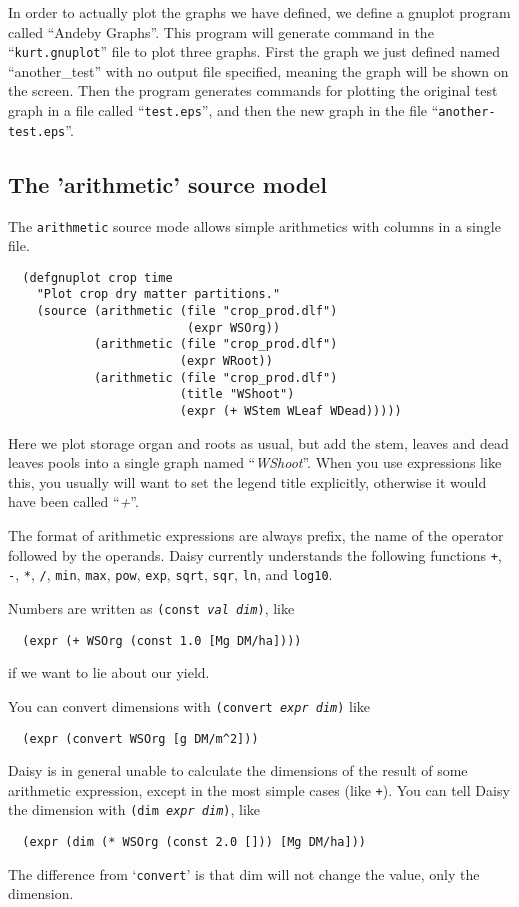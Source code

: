 \documentclass[a4paper]{article}
\begin{document}
In order to actually plot the graphs we have defined, we define a
gnuplot program called ``Andeby Graphs''.  This program will generate
command in the ``\texttt{kurt.gnuplot}'' file to plot three graphs.
First the graph we just defined named ``another\_test'' with no output
file specified, meaning the graph will be shown on the screen.  Then
the program generates commands for plotting the original test graph in
a file called ``\texttt{test.eps}'', and then the new graph in the
file ``\texttt{another-test.eps}''.

\subsection{The 'arithmetic' source model}

The \texttt{arithmetic} source mode allows simple arithmetics with
columns in a single file.
\begin{verbatim}
  (defgnuplot crop time
    "Plot crop dry matter partitions."
    (source (arithmetic (file "crop_prod.dlf")
                         (expr WSOrg))
            (arithmetic (file "crop_prod.dlf")
                        (expr WRoot))
            (arithmetic (file "crop_prod.dlf")
                        (title "WShoot")
                        (expr (+ WStem WLeaf WDead)))))
\end{verbatim}
Here we plot storage organ and roots as usual, but add the stem,
leaves and dead leaves pools into a single graph named ``\emph{WShoot}''.  When
you use expressions like this, you usually will want to set the legend
title explicitly, otherwise it would have been called ``\emph{+}''.

The format of arithmetic expressions are always prefix, the name of
the operator followed by the operands.  Daisy currently understands
the following functions \texttt{+}, \texttt{-}, \texttt{*},
\texttt{/}, \texttt{min}, \texttt{max}, \texttt{pow}, \texttt{exp},
\texttt{sqrt}, \texttt{sqr}, \texttt{ln}, and \texttt{log10}.

Numbers are written as \texttt{(const \textit{val} \textit{dim})}, like
\begin{verbatim}
  (expr (+ WSOrg (const 1.0 [Mg DM/ha])))
\end{verbatim}
if we want to lie about our yield.

You can convert dimensions with \texttt{(convert \textit{expr}
  \textit{dim})} like
\begin{verbatim}
  (expr (convert WSOrg [g DM/m^2]))
\end{verbatim}
Daisy is in general unable to calculate the dimensions of the result
of some arithmetic expression, except in the most simple cases (like
\texttt{+}).  You can tell Daisy the dimension with \texttt{(dim \textit{expr} \textit{dim})}, like
\begin{verbatim}
  (expr (dim (* WSOrg (const 2.0 [])) [Mg DM/ha]))
\end{verbatim}
The difference from `\texttt{convert}' is that dim will not change the
value, only the dimension.
\end{document}
